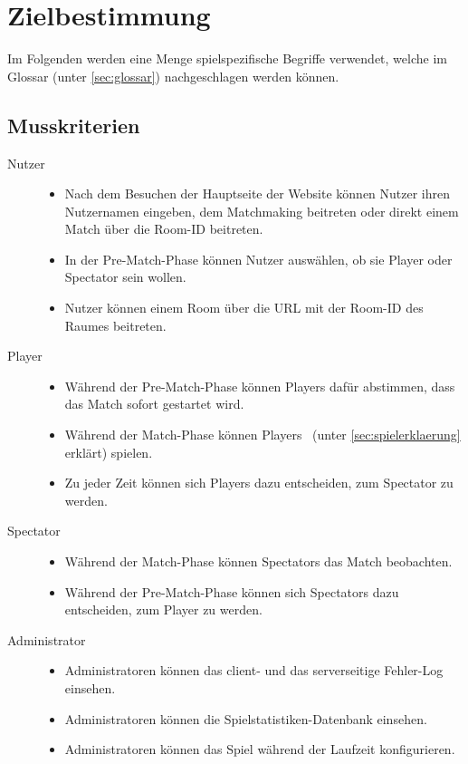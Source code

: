 \section{Zielbestimmung}

\newcommand{\crit}[2]{
	\item[#1] \hfill
		\begin{itemize}
			#2
		\end{itemize}
}

Im Folgenden werden eine Menge spielspezifische Begriffe verwendet, welche im Glossar (unter \ref{sec:glossar}) nachgeschlagen werden können.

\subsection{Musskriterien}
\begin{description}
	\crit{Nutzer}{
		\item Nach dem Besuchen der Hauptseite der Website können Nutzer ihren Nutzernamen eingeben, dem Matchmaking beitreten oder direkt einem Match über die Room-ID beitreten.
		\item In der Pre-Match-Phase können Nutzer auswählen, ob sie Player oder Spectator sein wollen.
		\item Nutzer können einem Room über die URL mit der Room-ID des Raumes beitreten.
	}
	\crit{Player}{
		\item Während der Pre-Match-Phase können Players dafür abstimmen, dass das Match sofort gestartet wird.
		\item Während der Match-Phase können Players \vires\ (unter \ref{sec:spielerklaerung} erklärt) spielen.
		\item Zu jeder Zeit können sich Players dazu entscheiden, zum Spectator zu werden.
	}
	\crit{Spectator}{
		\item Während der Match-Phase können Spectators das Match beobachten.
		\item Während der Pre-Match-Phase können sich Spectators dazu entscheiden, zum Player zu werden.
	}
	\crit{Administrator}{
		\item Administratoren können das client- und das serverseitige Fehler-Log einsehen.
		\item Administratoren können die Spielstatistiken-Datenbank einsehen.
		\item Administratoren können das Spiel während der Laufzeit konfigurieren.
	}
\end{description}

